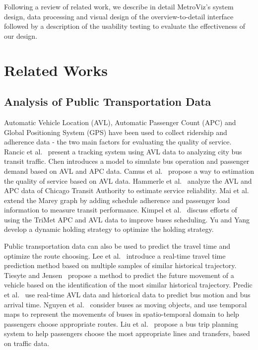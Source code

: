 \documentclass[journal]{vgtc}                %
\begin{document}
Following a review of related work, we describe in detail MetroViz's system design, data processing and visual design of the overview-to-detail interface followed by a description of the usability testing to evaluate the effectiveness of our design.

\section{Related Works}

\subsection{Analysis of Public Transportation Data}
Automatic Vehicle Location (AVL), Automatic Passenger Count (APC) and Global Positioning System (GPS) have been used to collect ridership and adherence data - the two main factors for evaluating the quality of service.
Rancic et al.~\cite{Rancic2008} present a tracking system using AVL data to analyzing city bus transit traffic. 
Chen \cite{5203406} introduces a model to simulate bus operation and passenger demand based on AVL and APC data. 
Camus et al.~\cite{camus2005estimation} propose a way to estimation the quality of service based on AVL data. 
Hammerle et al.~\cite{hammerle2005use} analyze the AVL and APC data of Chicago Transit Authority to estimate service reliability.
Mai et al.~\cite{mai2011visualizing} extend the Marey graph by adding schedule adherence and passenger load information to measure transit performance.
Kimpel et al.~\cite{4658140} discuss efforts of using the TriMet APC and AVL data to improve buses scheduling.
Yu and Yang~\cite{Yu2007} develop a dynamic holding strategy to optimize the holding strategy.

Public transportation data can also be used to predict the travel time and optimize the route choosing. 
Lee et al.~\cite{Lee:2012:HNF:2424321.2424357} introduce a real-time travel time prediction method based on multiple samples of similar historical trajectory. 
Tiesyte and Jensen~\cite{Tiesyte2008} propose a method to predict the future movement of a vehicle based on the identification of the most similar historical trajectory. 
Predic et al.~\cite{Predic2007} use real-time AVL data and historical data to predict bus motion and bus arrival time. 
Nguyen et al.~\cite{Nguyen2012} consider buses as moving objects, and use temporal maps to represent the movements of buses in spatio-temporal domain to help passengers choose appropriate routes. 
Liu et al.~\cite{5958130} propose a bus trip planning system to help passengers choose the most appropriate lines and transfers, based on traffic data.
\end{document}
